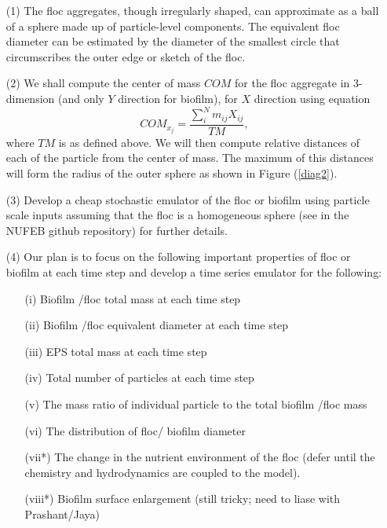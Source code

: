 \documentclass[12pt,titlepage]{report}
\theoremstyle{definition}
\theoremstyle{remark}
\begin{document}
\begin{itemize}
\item[(1)] The floc aggregates, though irregularly shaped, can approximate as a ball of a sphere made up of particle-level components. The equivalent floc diameter can be estimated by the diameter of the smallest circle that circumscribes the outer edge or sketch of the floc. 
\item[(2)] We shall compute the center of mass $COM$ for the floc aggregate in 3-dimension (and only $Y$ direction for biofilm), for $X$ direction using equation 
\begin{equation}
COM_{x_j}=\frac{\sum^N_i m_{ij} X_{ij}}{TM},
\end{equation}
where $TM$ is as defined above. We will then compute relative distances of each of the particle from the center of mass. The maximum of this distances will form the radius of the outer sphere as shown in Figure (\ref{diag2}).

\item[(3)] Develop a cheap stochastic emulator of the floc or biofilm using particle scale inputs assuming that the floc is a homogeneous sphere (see \cite{l12} in the NUFEB github repository) for further details.

\item[(4)] Our plan is to focus on the following important properties of floc or biofilm at each time step and develop a time series emulator for the following: 
\begin{itemize}
\item[(i)] Biofilm /floc total mass at each time step
\item[(ii)] Biofilm /floc equivalent diameter at each time step
\item[(iii)] EPS total mass at each time step
\item[(iv)] Total number of particles at each time step
\item[(v)] The mass ratio of individual particle to the total biofilm /floc mass
\item[(vi)] The distribution of floc/ biofilm diameter
\item[(vii*)] The change in the nutrient environment of the floc (defer until the chemistry and hydrodynamics are coupled to the model).
\item[(viii*)] Biofilm surface enlargement (still tricky; need to liase with Prashant/Jaya)
\end{itemize}
\end{itemize}
\end{document}
